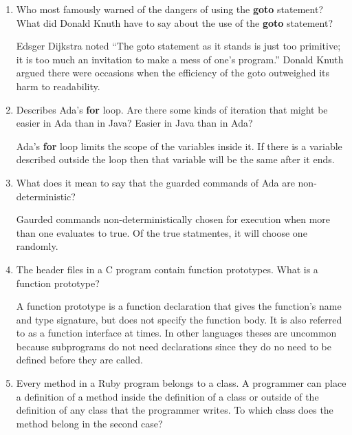 \begin{enumerate}
\begin{answer}
    \end{answer}

  \item Who most famously warned of the dangers of using the
    \textbf{goto} statement? What did Donald Knuth have to
    say about the use of the \textbf{goto} statement?

    \begin{answer}
    Edsger Dijkstra noted “The goto statement as it stands is just too primitive; it is too much an invitation to make a mess of one’s program.” Donald Knuth argued there were occasions when the efficiency of the goto outweighed its harm to readability.
    \end{answer}

  \item Describes Ada's \textbf{for} loop. Are there some
    kinds of iteration that might be easier in Ada than
    in Java? Easier in Java than in Ada?

    \begin{answer}
    Ada's \textbf{for} loop limits the scope of the variables inside it.  If there is a variable described outside the loop then that variable will be the same after it ends.
    \end{answer}

  \item What does it mean to say that the guarded commands
    of Ada are non-deterministic?

    \begin{answer}
    Gaurded commands non-deterministically chosen for execution when more than one evaluates to true.  Of the true statmentes, it will choose one randomly.
    \end{answer}

  \item The header files in a C program contain function
    prototypes. What is a function prototype?

  \begin{answer}
  A function prototype is a function declaration that gives the function's name and type signature, but does not specify the function body. It is also referred to as a function interface at times. In other languages theses are uncommon because subprograms do not need declarations since they do no need to be defined before they are called. 
  \end{answer}

  \item Every method in a Ruby program belongs to a class.
    A programmer can place a definition of a method inside
    the definition of a class or outside of the definition
    of any class that the programmer writes. To which class
    does the method belong in the second case?


\end{enumerate}

